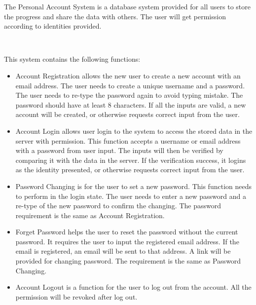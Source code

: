 The Personal Account System is a database system provided for all users to store the progress and share the data with others. The user will get permission according to identities provided.

~

This system contains the following functions:
\begin{itemize}
	\item Account Registration allows the new user to create a new account with an email address. The user needs to create a unique username and a password. The user needs to re-type the password again to avoid typing mistake. The password should have at least 8 characters. If all the inputs are valid, a new account will be created, or otherwise requests correct input from the user.
	\item Account Login allows user login to the system to access the stored data in the server with permission. This function accepts a username or email address with a password from user input. The inputs will then be verified by comparing it with the data in the server. If the verification success, it logins as the identity presented, or otherwise requests correct input from the user.
	\item Password Changing is for the user to set a new password. This function needs to perform in the login state. The user needs to enter a new password and a re-type of the new password to confirm the changing. The password requirement is the same as Account Registration.
	\item Forget Password helps the user to reset the password without the current password. It requires the user to input the registered email address. If the email is registered, an email will be sent to that address. A link will be provided for changing password. The requirement is the same as Password Changing.
	\item Account Logout is a function for the user to log out from the account. All the permission will be revoked after log out.
\end{itemize}
